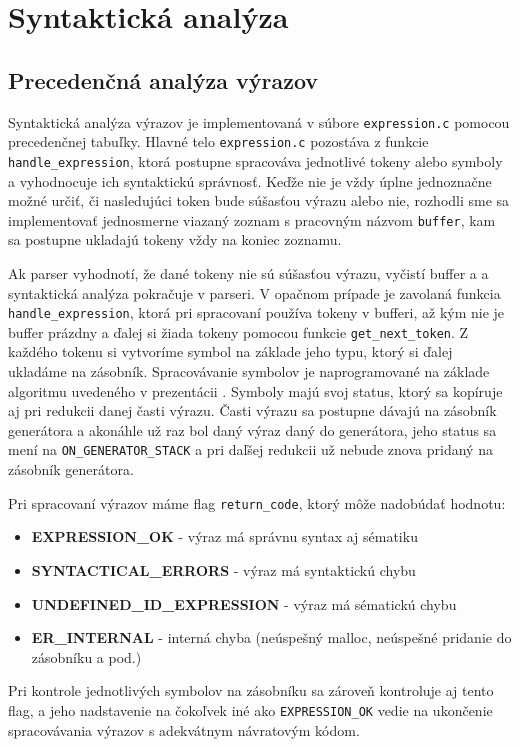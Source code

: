 \documentclass [11pt, a4paper]{article}
\begin{document}
\section{Syntaktická analýza}

\subsection{Precedenčná analýza výrazov}
Syntaktická analýza výrazov je implementovaná v súbore \texttt{expression.c} pomocou precedenčnej tabuľky. Hlavné telo \texttt{expression.c} pozostáva z funkcie \texttt{handle\_expression}, ktorá postupne spracováva jednotlivé tokeny alebo symboly a vyhodnocuje ich syntaktickú správnosť. Keďže nie je vždy úplne jednoznačne možné určiť, či nasledujúci token bude súšasťou výrazu alebo nie, rozhodli sme sa implementovať jednosmerne viazaný zoznam s pracovným názvom \texttt{buffer}, kam sa postupne ukladajú tokeny vždy na koniec zoznamu.

 Ak parser vyhodnotí, že dané tokeny nie sú súšasťou výrazu, vyčistí buffer a a syntaktická analýza pokračuje v parseri. V opačnom prípade je zavolaná funkcia \texttt{handle\_expression}, ktorá pri spracovaní používa tokeny v bufferi, až kým nie je buffer prázdny a ďalej si žiada tokeny pomocou funkcie \texttt{get\_next\_token}. Z každého tokenu si vytvoríme symbol na základe jeho typu, ktorý si ďalej ukladáme na zásobník. Spracovávanie symbolov je naprogramované na základe algoritmu uvedeného v prezentácii \cite{IFJpred}. Symboly majú svoj status, ktorý sa kopíruje aj pri redukcii danej časti výrazu. Časti výrazu sa postupne dávajú na zásobník generátora a akonáhle už raz bol daný výraz daný do generátora, jeho status sa mení na \texttt{ON\_GENERATOR\_STACK} a pri daľšej redukcii už nebude znova pridaný na zásobník generátora. 

Pri spracovaní výrazov máme flag \texttt{return\_code}, ktorý môže nadobúdať hodnotu:
\begin{itemize}
\item \textbf{EXPRESSION\_OK} - výraz má správnu syntax aj sématiku
\item \textbf{SYNTACTICAL\_ERRORS} - výraz má syntaktickú chybu
\item \textbf{UNDEFINED\_ID\_EXPRESSION} - výraz má sématickú chybu
\item \textbf{ER\_INTERNAL} - interná chyba (neúspešný malloc, neúspešné pridanie do zásobníku a pod.)
\end{itemize}

Pri kontrole jednotlivých symbolov na zásobníku sa zároveň kontroluje aj tento flag, a jeho nadstavenie na čokoľvek iné ako \texttt{EXPRESSION\_OK} vedie na ukončenie spracovávania výrazov s adekvátnym návratovým kódom.
\end{document}

